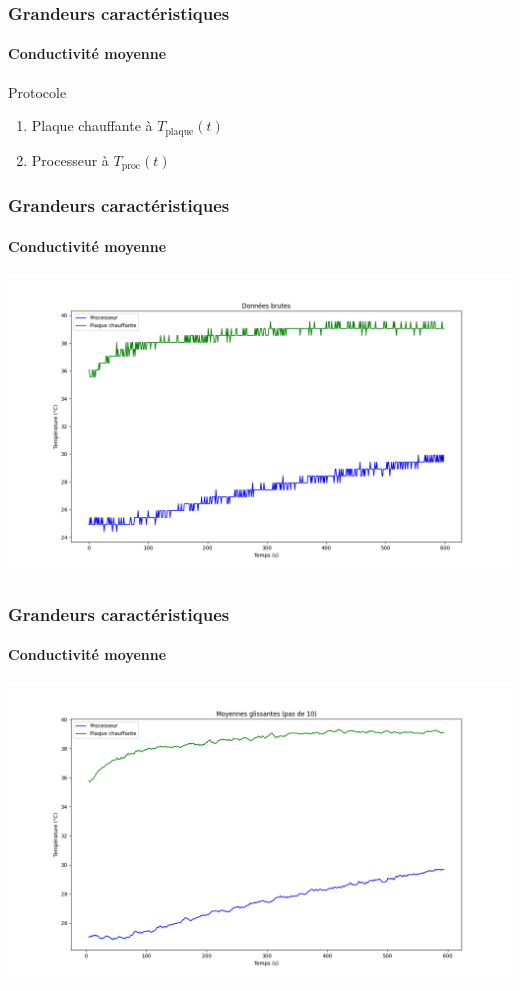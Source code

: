 \documentclass[a4paper,11pt]{beamer}
\begin{document}
\begin{frame}
    \frametitle{Grandeurs caractéristiques}
    \framesubtitle{Conductivité moyenne}

    Protocole
    \begin{enumerate}
        \item Plaque chauffante à $T_\text{plaque}(t)$
        \item Processeur à $T_\text{proc}(t)$
    \end{enumerate}
\end{frame}

\begin{frame}
    \frametitle{Grandeurs caractéristiques}
    \framesubtitle{Conductivité moyenne}

    \includegraphics[width=\textwidth]{donnees_brutes.png}
\end{frame}

\begin{frame}
    \frametitle{Grandeurs caractéristiques}
    \framesubtitle{Conductivité moyenne}

    \includegraphics[width=\textwidth]{moyennes_glissantes.png}
\end{frame}
\end{document}
